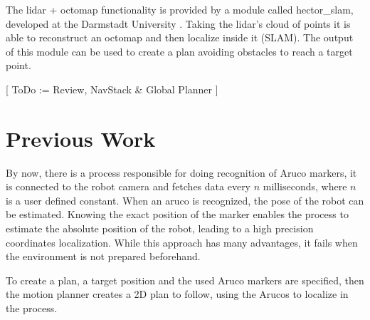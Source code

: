     The lidar + octomap functionality is provided by a module called hector\_slam, developed at the Darmstadt University \cite{hector_slam}. Taking the lidar's cloud of points it is able to reconstruct an octomap and then localize inside it (SLAM). The output of this module can be used to create a plan avoiding obstacles to reach a target point.

    [ ToDo := Review, NavStack \& Global Planner ]

  \section{Previous Work} \label{ch_2:sect:3}

    By now, there is a process responsible for doing recognition of Aruco markers, it is connected to the robot camera and fetches data every $n$ milliseconds, where $n$ is a user defined constant. When an aruco is recognized, the pose of the robot can be estimated. Knowing the exact position of the marker enables the process to estimate the absolute position of the robot, leading to a high precision coordinates localization. While this approach has many advantages, it fails when the environment is not prepared beforehand.

    To create a plan, a target position and the used Aruco markers are specified, then the motion planner creates a 2D plan to follow, using the Arucos to localize in the process.

    \begin{comment}
      \begin{itemize}
      \end{itemize}
    \end{comment}

